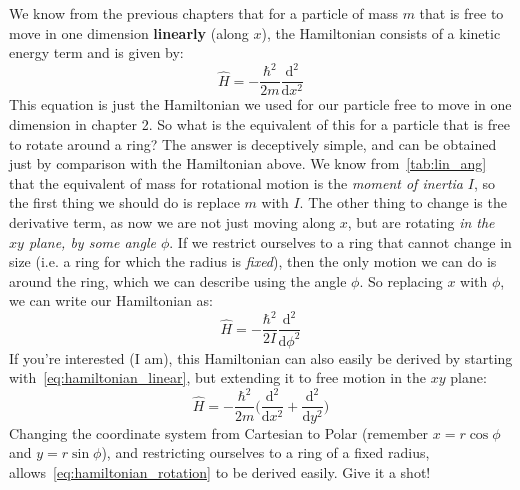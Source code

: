 \documentclass{memoir}[11pt,oneside,a4paper,openany]
\newcommand{\dd}{\ensuremath{\mathrm{d}}}
\begin{document}
We know from the previous chapters that for a particle of mass $m$ that is free to move in one dimension \textbf{linearly} (along $x$), the Hamiltonian consists of a kinetic energy term and is given by:
\begin{equation}\label{eq:hamiltonian_linear}
	\hat{H} = -\frac{\hbar^2}{2m}\frac{\dd^2}{\dd x^2}
\end{equation}
This equation is just the Hamiltonian we used for our particle free to move in one dimension in chapter 2. So what is the equivalent of this for a particle that is free to rotate around a ring? The answer is deceptively simple, and can be obtained just by comparison with the Hamiltonian above. We know from~\autoref{tab:lin_ang} that the equivalent of mass for rotational motion is the \emph{moment of inertia} $I$, so the first thing we should do is replace $m$ with $I$. The other thing to change is the derivative term, as now we are not just moving along $x$, but are rotating \emph{in the $xy$ plane, by some angle $\phi$}. If we restrict ourselves to a ring that cannot change in size (i.e. a ring for which the radius is \emph{fixed}), then the only motion we can do is around the ring, which we can describe using the angle $\phi$. So replacing $x$ with $\phi$, we can write our Hamiltonian as:
\begin{equation}\label{eq:hamiltonian_rotation}
	\hat{H} = -\frac{\hbar^2}{2I}\frac{\dd^2}{\dd \phi^2}
\end{equation}
If you're interested (I am), this Hamiltonian can also easily be derived by starting with~\autoref{eq:hamiltonian_linear}, but extending it to free motion in the $xy$ plane:
\begin{equation}
	\hat{H} = -\frac{\hbar^2}{2m}\bigg(\frac{\dd^2}{\dd x^2} + \frac{\dd^2}{\dd y^2}\bigg)
\end{equation}
Changing the coordinate system from Cartesian to Polar (remember $x = r\cos\phi$ and $y = r\sin\phi$), and restricting ourselves to a ring of a fixed radius, allows~\autoref{eq:hamiltonian_rotation} to be derived easily. Give it a shot!
\end{document}
